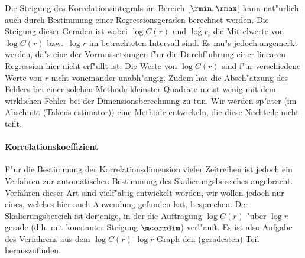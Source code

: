 Die Steigung des Korrelationsintegrals im Bereich $[\rmin,\rmax[$ kann nat"urlich auch
durch Bestimmung einer Regressionsgeraden berechnet werden. Die Steigung dieser Geraden
ist
wobei $\overline{\log C(r)}$ und $\overline{\log r_i}$ die Mittelwerte von $\log C(r)$
bzw.\  $\log r$ im betrachteten Intervall sind. Es mu"s jedoch angemerkt werden, da"s eine 
der Vorraussetzungen f"ur die Durchf"uhrung einer linearen Regression hier nicht
erf"ullt ist. Die Werte von $\log C(r)$ sind f"ur verschiedene Werte von $r$ nicht
voneinander unabh"angig. Zudem hat die Absch"atzung des Fehlers bei einer solchen Methode
kleinster Quadrate meist wenig mit dem wirklichen Fehler bei der Dimensionsberechnung zu
tun. Wir werden sp"ater (im Abschnitt \korrektur(Takens estimator)) eine Methode
entwickeln, die diese Nachteile nicht teilt.

\paragraph{Korrelationskoeffizient}
F"ur die Bestimmung der Korrelationsdimension vieler Zeitreihen ist jedoch ein Verfahren
zur automatischen Bestimmung des Skalierungsbereiches angebracht. Verfahren dieser Art
sind vielf"altig entwickelt worden, wir wollen jedoch nur eines, welches hier auch
Anwendung gefunden hat, besprechen. Der Skalierungsbereich ist derjenige, in der die
Auftragung $\log C(r)$ "uber $\log r$ gerade (d.h. mit konstanter Steigung $\mcorrdim$)
verl"auft. Es ist also Aufgabe des Verfahrens aus dem $\log C(r)$-$\log r$-Graph den
\naja(geradesten) Teil herauszufinden. 

